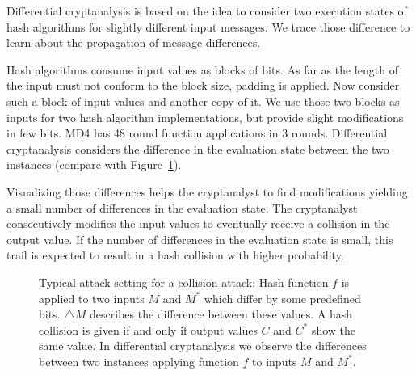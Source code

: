 Differential cryptanalysis is based on the idea to consider two execution states
of hash algorithms for slightly different input messages. We trace those difference
to learn about the propagation of message differences.

Hash algorithms consume input values as blocks of bits.
As far as the length of the input must not conform to the block size,
padding is applied. Now consider such a block of input values
and another copy of it. We use those two blocks as inputs for two
hash algorithm implementations, but provide slight modifications in few bits.
MD4 has 48 round function applications in 3 rounds.
Differential cryptanalysis considers the difference in the evaluation
state between the two instances (compare with Figure~\ref{tab:collision-attack}).

Visualizing those differences helps the cryptanalyst to find modifications yielding
a small number of differences in the evaluation state.
The cryptanalyst consecutively modifies the input values to eventually
receive a collision in the output value.
If the number of differences in the evaluation state is small,
this trail is expected to result in a hash collision with higher probability.

\begin{figure}[pbt]
  \begin{center}
    \caption[Typical attack setting for a collision attack]{
      Typical attack setting for a collision attack:
      Hash function $f$ is applied to two inputs $M$ and $M^*$ which differ
      by some predefined bits. $\triangle M$ describes the difference between
      these values. A hash collision is given if and only if output values
      $C$ and $C^*$ show the same value. In differential cryptanalysis we observe
      the differences between two instances applying function $f$
      to inputs $M$ and $M^*$.
    }
    \label{tab:collision-attack}
  \end{center}
\end{figure}

